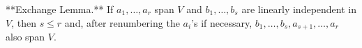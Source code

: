 **Exchange Lemma.** If $a_1, \ldots, a_r$ span $V$ and $b_1, \ldots, b_s$ are linearly independent in $V$, then $s \leq r$ and, after renumbering the $a_i$'s if necessary, $b_1, \ldots, b_s, a_{s+1}, \ldots, a_r$ also span $V$.
